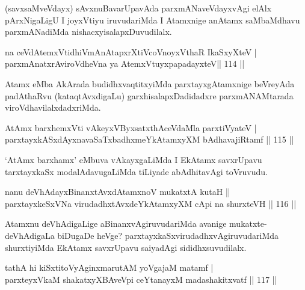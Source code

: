 \begin{artha}
(savxsaMveVdayx) sAvxnuBavarUpavAda parxmANaveVdayxvAgi elAlx pArxNigaLigU I joyxVtiyu iruvudariMda I Atamxnige anAtamx saMbaMdhavu parxmANadiMda nishacxyisalapxDuvudilalx.
\end{artha}

\begin{shl}
na ceVdAtemxVtidhiVmAnAtapxrXtiVcoVnoyxV\s thaR IkaSxyXteV | \\
parxmAnatxrAviroVdheVna ya AtemxVtuyxpapadayxteV\hfill ||  114 ||  
\end{shl}

\begin{artha}
Atamx eMba AkArada budidhxvaqtitxyiMda parxtayxgAtamxnige beVreyAda padAthaRvu (kataqtAvxdigaLu) garxhisalapxDadidadxre parxmANAMtarada viroVdhavilalxdadxriMda. 
\end{artha}

\begin{shl}
AtAmx barxhemxVti vAkeyxVByxsatxthAceVdaMla parxtiVyateV | \\
parxtayxkASxdAyxnavaSaTxbadhxmeYkAtamxyXM bAdhavajiRtamf \hfill||  115 ||  
\end{shl}

\begin{artha}
`AtAmx barxhamx' eMbuva vAkayxgaLiMda I EkAtamx savxrUpavu tarxtayxkaSx modalAdavugaLiMda tiLiyade abAdhitavAgi toVruvudu.
\end{artha}


\begin{shl}
nanu deVhAdayxBinanxtAvxdAtamxnoV mukatxtA kutaH ||  \\
parxtayxkeSxVNa virudadhxtAvxdeYkAtamxyXM cApi na shurxteVH \hfill||  116 ||  
\end{shl}

\begin{artha}
Atamxnu deVhAdigaLige aBinanxvAgiruvudariMda avanige mukatxte- deVhAdigaLa biDugaDe heVge? parxtayxkaSxvirudadhxvAgiruvudariMda shurxtiyiMda EkAtamx savxrUpavu saiyadAgi sididhxsuvudilalx.
\end{artha}


\begin{shl}
tathA hi kiSxtitoVyAginxmarutAM yoVgajaM matamf | \\
parxteyxVkaM shakatxyXBAveV\s pi ceYtanayxM madashakitxvatf \hfill||  117 ||  
\end{shl}

